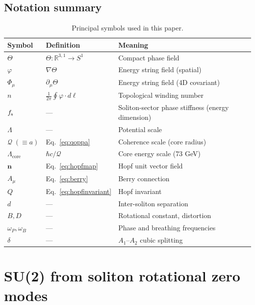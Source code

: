 \documentclass[a4paper,12pt]{article}
\newcommand{\Qoppa}{\mathcal{Q}} %
\newcommand{\qoppa}{\Qoppa} %
\newcommand{\fsol}{f_{\rm s}}
\begin{document}
\subsection{Notation summary}

\begin{table}[t]
\centering
\caption{Principal symbols used in this paper.}
\label{tab:notation}
\begin{tabular}{@{}lll@{}}
\toprule
Symbol & Definition & Meaning \\
\midrule
$\Theta$ & $\Theta: \mathbb{R}^{3,1} \to S^1$ & Compact phase field \\
$\varphi$ & $\nabla\Theta$ & Energy string field (spatial) \\
$\Phi_\mu$ & $\partial_\mu\Theta$ & Energy string field (4D covariant) \\
$n$ & $\frac{1}{2\pi}\oint \varphi \cdot d\ell$ & Topological winding number \\
$\fsol$ & --- & Soliton-sector phase stiffness (energy dimension) \\
$\Lambda$ & --- & Potential scale \\
$\qoppa\;(\equiv a)$ & Eq.~\eqref{eq:qoppa} & Coherence scale (core radius) \\
$\Lambda_{\mathrm{core}}$ & $\hbar c / \qoppa$ & Core energy scale (73 GeV) \\
$\mathbf{n}$ & Eq.~\eqref{eq:hopfmap} & Hopf unit vector field \\
$A_\mu$ & Eq.~\eqref{eq:berry} & Berry connection \\
$Q$ & Eq.~\eqref{eq:hopfinvariant} & Hopf invariant \\
$d$ & --- & Inter-soliton separation \\
$B, D$ & --- & Rotational constant, distortion \\
$\omega_P, \omega_B$ & --- & Phase and breathing frequencies \\
$\delta$ & --- & $A_1$--$A_2$ cubic splitting \\
\bottomrule
\end{tabular}
\end{table}


\section{SU(2) from soliton rotational zero modes}
\label{sec:su2}
\end{document}
